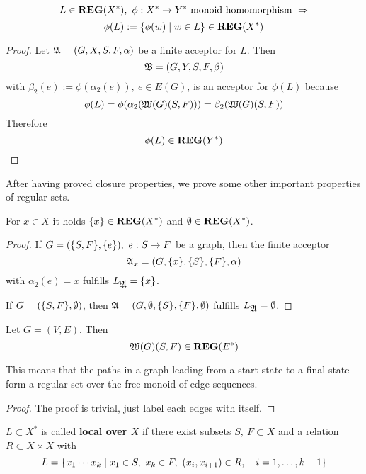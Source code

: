 \bigskip
\begin{theorem}
\[ L \in \mbox{{\bf REG}}(X^*),\ \phi : X^* \to Y^* \mbox{ monoid homomorphism }
\Rightarrow \]
\[ \phi(L) := \mbox{$\{\phi(w) \mid w \in L\}$} \in \mbox{{\bf REG}}(X^*) \]
\end{theorem}
\begin{proof}
Let $\mbox{$\mathfrak{A}$} = (G, X, S, F, \alpha)$ be a finite acceptor for $L$. Then \[
\mbox{$\mathfrak{B}$} = (G, Y, S, F, \beta)\] with $\beta_2(e) := \phi(\alpha_2(e)),\ e \in
E(G)$, is an acceptor for $\phi(L)$ because \[\phi(L) =
\phi(\alpha_2(\mbox{$\mathfrak{W}({G})$}(S, F))) = \beta_2(\mbox{$\mathfrak{W}({G})$}(S,F))\]
Therefore \[ \phi(L) \in \mbox{{\bf REG}}(Y^*) \]
\end{proof}

After having proved closure properties, we prove some other important properties
of regular sets.

\begin{lemma}
For $x \in X$ it holds $\mbox{$\{x\}$} \in \mbox{{\bf REG}}(X^*)$ and $\emptyset \in \mbox{{\bf REG}}(X^*)$.
\end{lemma}
\begin{proof}
If $G = (\mbox{$\{S,F\}$}, \mbox{$\{e\}$}),\ e: S \to F$ be a graph, then the finite
acceptor \[\mbox{$\mathfrak{A}$}_x = (G, \mbox{$\{x\}$}, \mbox{$\{S\}$}, \mbox{$\{F\}$}, \alpha)\] with $\alpha_2(e) =
x$ fulfills $L_{\mbox{$\mathfrak{A}$}} = \mbox{$\{x\}$}$.

If $G = (\mbox{$\{S,F\}$}, \emptyset)$, then $\mbox{$\mathfrak{A}$} = (G, \emptyset, \mbox{$\{S\}$},
\mbox{$\{F\}$}, \emptyset)$ fulfills $L_{\mbox{$\mathfrak{A}$}} = \emptyset$.
\end{proof}

\bigskip
\begin{lemma}
Let $G = (V, E)$. Then \[ \mbox{$\mathfrak{W}({G})$}(S,F) \in \mbox{{\bf REG}}(E^*) \]
\end{lemma}
This means that the paths in a graph leading from a start state to a final state
form a regular set over the free monoid of edge sequences. 
\begin{proof}
The proof is trivial, just label each edges with itself.
\end{proof}

\bigskip
\begin{definition}
$L \subset X^*$ is called {\bf local over $X$} if there exist subsets $S,\ F
\subset X$ and a relation $R \subset X \times X$ with 
\[ L = \mbox{$\{x_1 \cdots x_k \mid x_1 \in S,\ x_k \in F,\ (x_i, x_{i+1}) \in R,
\quad i = 1, \ldots, k - 1\}$} \]
\end{definition}


